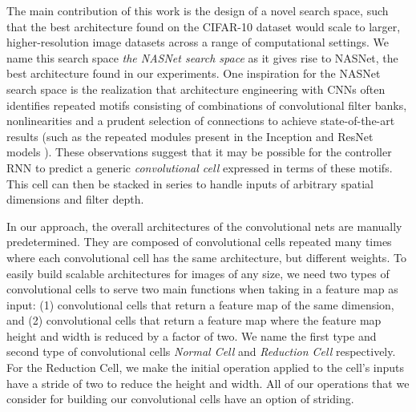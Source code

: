 

The main contribution of this work is the design of a novel search space, such that the best architecture found on the CIFAR-10 dataset would scale to larger, higher-resolution image datasets across a range of computational settings.
We name this search space \emph{the NASNet search space} as it gives rise to NASNet, the best architecture found in our experiments. One inspiration for the NASNet search space is the realization that architecture engineering with CNNs often identifies 
repeated motifs consisting of combinations of convolutional
filter banks, nonlinearities and a prudent selection of
connections to achieve state-of-the-art results (such as the repeated modules present in the Inception and ResNet models \cite{szegedy2015going,he2015deep,szegedy2016rethinking,szegedy2016inception}). These observations suggest that it may be possible for the controller RNN to predict a generic {\it convolutional cell} expressed in terms of these motifs. This cell can then be stacked in series to handle inputs of arbitrary spatial dimensions and filter depth. 




In our approach, the overall architectures of the convolutional nets are manually predetermined. They are composed of convolutional cells repeated many times where each convolutional cell has the same architecture, but different weights. To easily build scalable architectures for images of any size, we need two types of convolutional cells to serve two main functions when taking in a feature map as input: (1) convolutional cells that return a feature map of the same dimension,  and (2) convolutional cells that return a feature map where the feature map height and width is reduced by a factor of two. We name the first type and second type of convolutional cells  \emph{Normal Cell} and \emph{Reduction Cell} respectively. For the Reduction Cell, we make the initial operation applied to the cell's inputs have a stride of two to reduce the height and width. All of our operations that we consider for building our convolutional cells have an option of striding.

